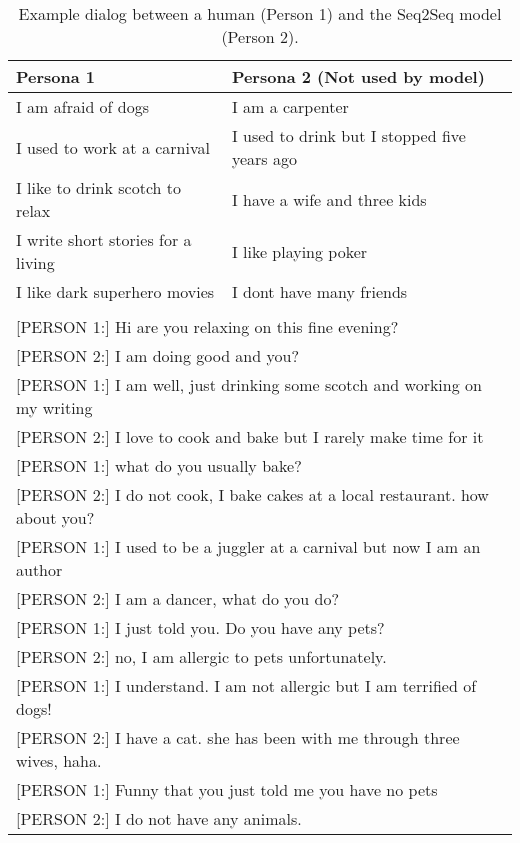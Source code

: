 \documentclass[11pt,a4paper]{article}
\begin{document}
\begin{table*}[t]
  \begin{center}
    \begin{small}
      \begin{tabular}{l|l}
        \toprule
        \textbf{Persona 1} & \textbf{Persona 2 (Not used by model)}\\
        \midrule
I am afraid of dogs & I am a carpenter \\
I used to work at a carnival & I used to drink but I stopped five years ago\\
I like to drink scotch to relax & I have a wife and three kids\\
I write short stories for a living & I like playing poker\\
I like dark superhero movies & I dont have many friends\\
\bottomrule
\multicolumn{2}{l}{ }\\
\multicolumn{2}{l}{[PERSON 1:] Hi are you relaxing on this fine evening?}\\
\multicolumn{2}{l}{[PERSON 2:] I am doing good and you?}\\
\multicolumn{2}{l}{[PERSON 1:] I am well, just drinking some scotch and working on my writing}\\
\multicolumn{2}{l}{[PERSON 2:] I love to cook and bake but I rarely make time for it} \\
\multicolumn{2}{l}{[PERSON 1:] what do you usually bake?}\\
\multicolumn{2}{l}{[PERSON 2:] I do not cook, I bake cakes at a local restaurant. how about you?}\\
\multicolumn{2}{l}{[PERSON 1:] I used to be a juggler at a carnival but now I am an author}\\
\multicolumn{2}{l}{[PERSON 2:] I am a dancer, what do you do?}\\ 
\multicolumn{2}{l}{[PERSON 1:] I just told you. Do you have any pets?}\\
\multicolumn{2}{l}{[PERSON 2:] no, I am allergic to pets unfortunately.}\\ 
\multicolumn{2}{l}{[PERSON 1:] I understand. I am not allergic but I am terrified of dogs!}\\
\multicolumn{2}{l}{[PERSON 2:] I have a cat. she has been with me through three wives, haha.}\\
\multicolumn{2}{l}{[PERSON 1:] Funny that you just told me you have no pets}\\
\multicolumn{2}{l}{[PERSON 2:] I do not have any animals.}\\
      \end{tabular}
      \caption{Example dialog between a human (Person 1) and the Seq2Seq model (Person 2). 
 \label{table:s2s-example}}
    \end{small}
  \end{center}
\end{table*}
\end{document}
